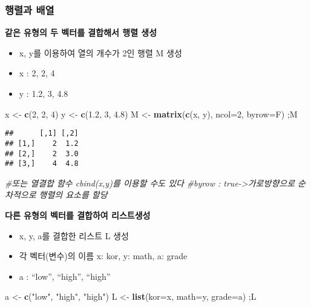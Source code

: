\documentclass[]{article}
\title{}
\author{}
\date{}
\newenvironment{Shaded}{\begin{snugshade}}{\end{snugshade}}
\newcommand{\KeywordTok}[1]{\textcolor[rgb]{0.13,0.29,0.53}{\textbf{#1}}}
\newcommand{\DataTypeTok}[1]{\textcolor[rgb]{0.13,0.29,0.53}{#1}}
\newcommand{\DecValTok}[1]{\textcolor[rgb]{0.00,0.00,0.81}{#1}}
\newcommand{\FloatTok}[1]{\textcolor[rgb]{0.00,0.00,0.81}{#1}}
\newcommand{\StringTok}[1]{\textcolor[rgb]{0.31,0.60,0.02}{#1}}
\newcommand{\CommentTok}[1]{\textcolor[rgb]{0.56,0.35,0.01}{\textit{#1}}}
\newcommand{\NormalTok}[1]{#1}
\providecommand{\tightlist}{%
  \setlength{\itemsep}{0pt}\setlength{\parskip}{0pt}}
\begin{document}
\subsubsection{행렬과 배열}\label{-}

\textbf{같은 유형의 두 벡터를 결합해서 행렬 생성}

\begin{itemize}
\tightlist
\item
  x, y를 이용하여 열의 개수가 2인 행렬 M 생성
\item
  x : 2, 2, 4
\item
  y : 1.2, 3, 4.8
\end{itemize}

\begin{Shaded}
\begin{Highlighting}[]
\NormalTok{x <-}\StringTok{ }\KeywordTok{c}\NormalTok{(}\DecValTok{2}\NormalTok{, }\DecValTok{2}\NormalTok{, }\DecValTok{4}\NormalTok{)}
\NormalTok{y <-}\StringTok{ }\KeywordTok{c}\NormalTok{(}\FloatTok{1.2}\NormalTok{, }\DecValTok{3}\NormalTok{, }\FloatTok{4.8}\NormalTok{)}
\NormalTok{M <-}\StringTok{ }\KeywordTok{matrix}\NormalTok{(}\KeywordTok{c}\NormalTok{(x, y), }\DataTypeTok{ncol=}\DecValTok{2}\NormalTok{, }\DataTypeTok{byrow=}\NormalTok{F) ;M}
\end{Highlighting}
\end{Shaded}

\begin{verbatim}
##      [,1] [,2]
## [1,]    2  1.2
## [2,]    2  3.0
## [3,]    4  4.8
\end{verbatim}

\begin{Shaded}
\begin{Highlighting}[]
  \CommentTok{#또는 열결합 함수 cbind(x,y)를 이용할 수도 있다}
  \CommentTok{#byrow : true->가로방향으로 순차적으로 행렬의 요소를 할당}
\end{Highlighting}
\end{Shaded}

\textbf{다른 유형의 벡터를 결합하여 리스트생성}

\begin{itemize}
\tightlist
\item
  x, y, a를 결합한 리스트 L 생성
\item
  각 벡터(변수)의 이름 x: kor, y: math, a: grade
\item
  a : ``low'', ``high'', ``high''
\end{itemize}

\begin{Shaded}
\begin{Highlighting}[]
\NormalTok{a <-}\StringTok{ }\KeywordTok{c}\NormalTok{(}\StringTok{"low"}\NormalTok{, }\StringTok{"high"}\NormalTok{, }\StringTok{"high"}\NormalTok{)}
\NormalTok{L <-}\StringTok{ }\KeywordTok{list}\NormalTok{(}\DataTypeTok{kor=}\NormalTok{x, }\DataTypeTok{math=}\NormalTok{y, }\DataTypeTok{grade=}\NormalTok{a) ;L}
\end{Highlighting}
\end{Shaded}
\end{document}
